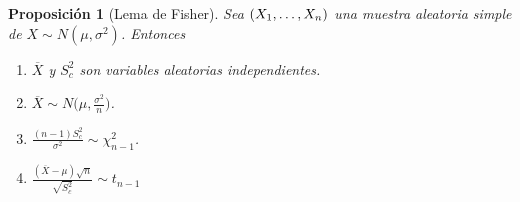 \documentclass[11pt]{report}
\newtheorem{proposition}{Proposición}
\theoremstyle{definition}
\begin{document}
\begin{proposition}[Lema de Fisher]
\label{prop20}
Sea $(X_1,\mathellipsis,X_n)$ una muestra aleatoria simple de $X \sim N(\mu,\sigma^2)$. Entonces
\begin{enumerate}
    \item $\overline{X}$ y $S_c^2$ son variables aleatorias independientes.
    \item $\displaystyle \overline{X} \sim N\bigl(\mu, \frac{\sigma^2}{n}\bigr)$.
    \item $\displaystyle \frac{(n-1)S_c^2}{\sigma^2} \sim \chi^2_{n-1}$.
    \item $\displaystyle \frac{(\overline{X}-\mu)\sqrt{n}}{\sqrt{S_c^2}} \sim t_{n-1}$
\end{enumerate} 
\end{proposition}
\end{document}
